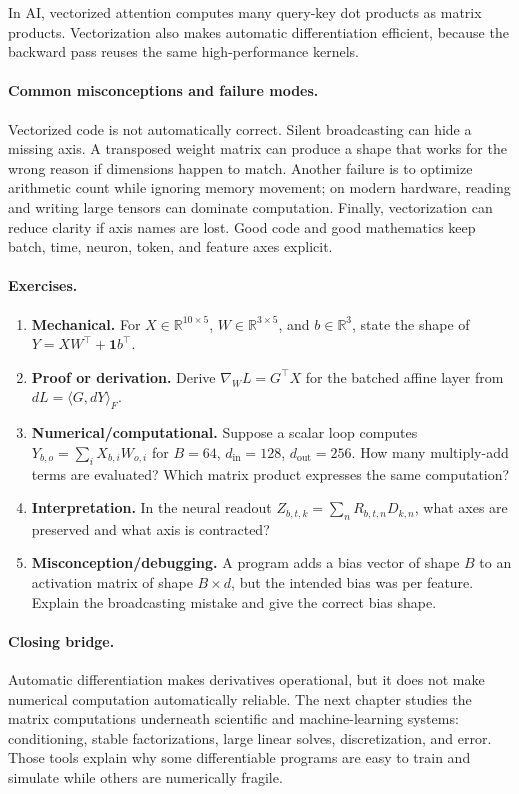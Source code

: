 In AI, vectorized attention computes many query-key dot products as matrix products. Vectorization also makes automatic differentiation efficient, because the backward pass reuses the same high-performance kernels.

\paragraph{Common misconceptions and failure modes.}
Vectorized code is not automatically correct. Silent broadcasting can hide a missing axis. A transposed weight matrix can produce a shape that works for the wrong reason if dimensions happen to match. Another failure is to optimize arithmetic count while ignoring memory movement; on modern hardware, reading and writing large tensors can dominate computation. Finally, vectorization can reduce clarity if axis names are lost. Good code and good mathematics keep batch, time, neuron, token, and feature axes explicit.

\paragraph{Exercises.}
\begin{enumerate}[label=\textbf{23.4.\arabic*.}, leftmargin=*]
\item \textbf{Mechanical.} For \(X\in\mathbb{R}^{10\times 5}\), \(W\in\mathbb{R}^{3\times 5}\), and \(b\in\mathbb{R}^3\), state the shape of \(Y=XW^\top+\mathbf{1}b^\top\).
\item \textbf{Proof or derivation.} Derive \(\nabla_W L=G^\top X\) for the batched affine layer from \(dL=\langle G,dY\rangle_F\).
\item \textbf{Numerical/computational.} Suppose a scalar loop computes \(Y_{b,o}=\sum_i X_{b,i}W_{o,i}\) for \(B=64\), \(d_{\mathrm{in}}=128\), \(d_{\mathrm{out}}=256\). How many multiply-add terms are evaluated? Which matrix product expresses the same computation?
\item \textbf{Interpretation.} In the neural readout \(Z_{b,t,k}=\sum_n R_{b,t,n}D_{k,n}\), what axes are preserved and what axis is contracted?
\item \textbf{Misconception/debugging.} A program adds a bias vector of shape \(B\) to an activation matrix of shape \(B\times d\), but the intended bias was per feature. Explain the broadcasting mistake and give the correct bias shape.
\end{enumerate}

\paragraph{Closing bridge.}
Automatic differentiation makes derivatives operational, but it does not make numerical computation automatically reliable. The next chapter studies the matrix computations underneath scientific and machine-learning systems: conditioning, stable factorizations, large linear solves, discretization, and error. Those tools explain why some differentiable programs are easy to train and simulate while others are numerically fragile.

\clearpage
